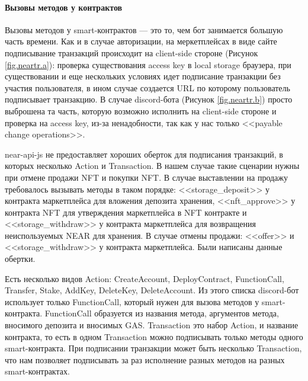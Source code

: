 \paragraph{Вызовы методов у контрактов}

Вызовы методов у smart-контрактов --- это то, чем бот занимается большую часть времени. Как и в случае авторизации, на меркетплейсах в виде сайте подписывание транзакций происходит на client-side стороне (Рисунок {\color{blue} \ref{fig.neartr.a}}): проверка существования access key в local storage браузера, при существовании и еще нескольких условиях идет подписание транзакции без участия пользователя, в ином случае создается URL по которому пользователь подписывает транзакцию. В случае discord-бота (Рисунок {\color{blue} \ref{fig.neartr.b}}) просто выброшена та часть, которую возможно исполнить на client-side стороне и проверка на access key, из-за ненадобности, так как у нас только <<payable change operations>>.

near-api-js не предоставляет хороших оберток для подписания транзакций, в которых несколько Action и Transaction. В нашем случае такие сценарии нужны при отмене продажи NFT и покупки NFT. В случае выставлении на продажу требовалось вызывать методы в таком порядке: <<storage\_deposit>> у контракта маркетплейса для вложения депозита хранения, <<nft\_approve>> у контракта NFT для утверждения маркетплейса в NFT контракте и <<storage\_withdraw>> у контракта маркетплейса для возвращения неиспользуемых NEAR для хранения. В случае отмены продажи: <<offer>> и <<storage\_withdraw>> у контракта маркетплейса. Были написаны данные обертки.

\begin{definition}
    Есть несколько видов Action: CreateAccount, DeployContract, FunctionCall, Transfer, Stake, AddKey, DeleteKey, DeleteAccount. Из этого списка discord-бот использует только FunctionCall, который нужен для вызова методов у smart-контракта. FunctionCall образуется из названия метода, аргументов метода, вносимого депозита и вносимых GAS. Transaction это набор Action, и название контракта, то есть в одном Transaction можно подписывать только методы одного smart-контракта. При подписании транзакции может быть несколько Transaction, что нам позволяет подписывать за раз исполнение разных методов на разных smart-контрактах.
\end{definition}

